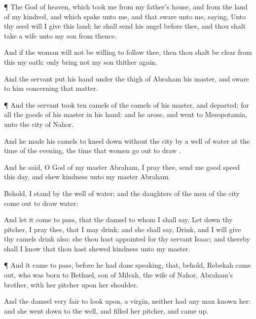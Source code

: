 {\par }{\PP {}¶ The
{}
God of
heaven, which took
me from my
father’s
house, and from the
land of my
kindred, and which
spake unto me, and that
sware unto me,
saying, Unto thy
seed will I
give this
land; he shall
send his
angel before
thee, and thou shalt
take a
wife unto my
son from thence.

And if the
woman will not be
willing to
follow
thee, then thou shalt be
clear from this my
oath: only
bring not my
son thither
again.

And the
servant
put his
hand under the
thigh of
Abraham his
master, and
sware to him
concerning
that
matter.


\par }{\PP {}¶ And the
servant
took
ten
camels of the
camels of his
master, and
departed; for all the
goods of his
master
{} in his
hand: and he
arose, and
went to
Mesopotamia, unto the
city of
Nahor.

And he
made his
camels to kneel
down
without the
city
by a
well of
water at the
time of the
evening,
{} the
time that women go
out to
draw
{}.

And he
said, O
{}
God of my
master
Abraham, I pray thee, send
me good
speed this
day, and
shew
kindness
unto my
master
Abraham.

Behold, I
stand
{} by the
well of
water; and the
daughters of the
men of the
city come
out to
draw
water:

And let it come to pass, that the
damsel to whom I shall
say, Let
down thy
pitcher, I pray thee, that I may
drink; and she shall
say,
Drink, and I will
give thy
camels
drink also:
{} she
{} thou hast
appointed for thy
servant
Isaac; and thereby shall I
know that thou hast
shewed
kindness unto my
master.


\par }{\PP {}¶ And it came to pass, before he had
done
speaking, that, behold,
Rebekah came
out,
who was
born to
Bethuel,
son of
Milcah, the
wife of
Nahor,
Abraham’s
brother, with her
pitcher upon her
shoulder.

And the
damsel
{}
very
fair to look
upon, a
virgin, neither had any
man
known her: and she went
down to the
well, and
filled her
pitcher, and came
up.

}

